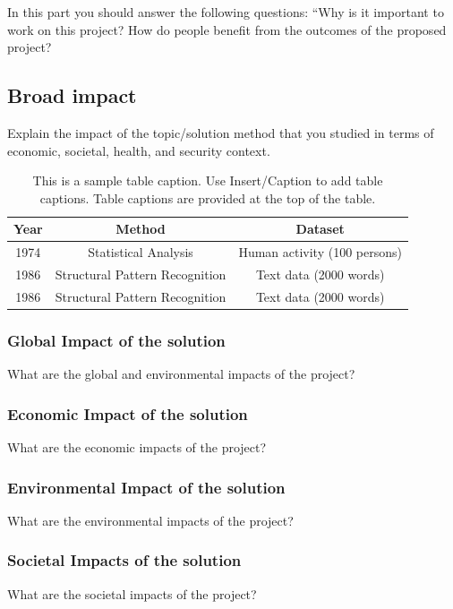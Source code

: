 \documentclass{mefsdp}
\begin{document}
	In this part you should answer the following questions: “Why is it important to work on this project? How do people benefit from the outcomes of the  proposed project?
	
	\subsection{Broad impact}
	
	Explain the impact of the topic/solution method that you studied in terms of economic, societal, health, and security context. 
	
	\begin{table}[h]
		\centering
		\begin{tabular}{| c | c | c |}
			\hline
			\bfseries Year & \bfseries Method & \bfseries Dataset \\
			\hline
			1974 & Statistical Analysis & Human activity (100 persons) \\
			1986 & Structural Pattern Recognition & Text data (2000 words) \\
			1986 & Structural Pattern Recognition & Text data (2000 words) \\
			\hline
		\end{tabular}
	\caption[First sample table]{This is a sample table caption. Use Insert/Caption to add table captions. Table captions are provided at the top of the table.}
	\end{table}
	
	\subsubsection{Global Impact of the solution}
	What are the global and environmental impacts of the project? 
	
	\subsubsection{Economic Impact of the solution}
	What are the economic impacts of the project? 
	
	\subsubsection{Environmental Impact of the solution}
	What are the environmental impacts of the project?
	
	\subsubsection{Societal Impacts of the solution}
	What are the societal impacts of the project?
	
\end{document}
